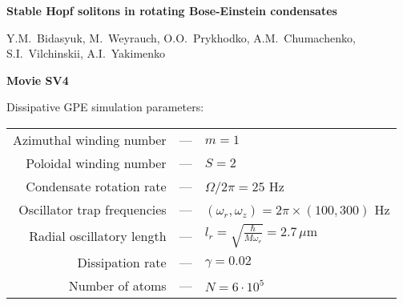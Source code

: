 \documentclass[letterpaper,landscape]{slides}
\begin{document}
\setcounter{page}{1}
\begin{center}

{\large \bf Stable Hopf solitons in rotating Bose-Einstein condensates}

\vspace {5mm}

{\small  Y.M.~Bidasyuk, M.~Weyrauch, O.O.~Prykhodko, A.M.~Chumachenko, S.I.~Vilchinskii, A.I.~Yakimenko}


{\large \textbf{Movie SV4}}


Dissipative GPE simulation parameters:

\vspace {5mm}

{\small \begin{tabular}{r c l}
		Azimuthal winding number & --- & $m = 1$ \\
		Poloidal winding number & --- & $S = 2$ \\
        Condensate rotation rate   & --- & $\Omega/2\pi = 25$ Hz  \\

Oscillator trap frequencies  & --- & $(\omega_r,\omega_z)=2\pi\times(100,300)$ Hz \\
        Radial oscillatory length  & --- & $l_r=\sqrt{\frac{\hbar}{M\omega_r}}=2.7\,\mu\mathrm{m}$ \\	
        Dissipation rate  & --- & $\gamma=0.02$ \\	
        Number of atoms  & --- & $N=6\cdot 10^5$     
\end{tabular}
}

\end{center}
\end{document}
